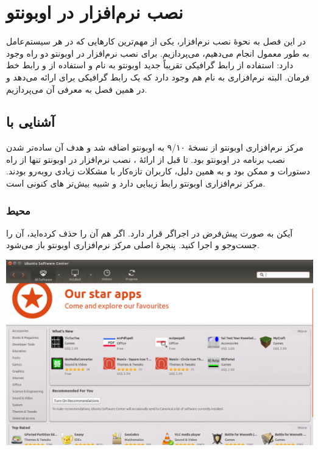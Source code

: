 \chapter{نصب نرم‌افزار در اوبونتو}
در این فصل به نحوهٔ نصب نرم‌افزار، یکی از مهم‌ترین کارهایی که در هر سیستم‌عامل به طور معمول انجام می‌دهیم، می‌پردازیم. برای نصب نرم‌افزار در اوبونتو دو راه وجود دارد: استفاده از رابط گرافیکی تقریباً جدید اوبونتو به نام  و استفاده از  و رابط خط فرمان. البته نرم‌افزاری به نام  هم وجود دارد که یک رابط گرافیکی برای  ارائه می‌دهد و در همین فصل به معرفی آن می‌پردازیم.

\section[آشنایی با Center Software Ubuntu]{آشنایی با }
مرکز نرم‌افزاری اوبونتو از نسخهٔ ۹/۱۰ به اوبونتو اضافه شد و هدف آن ساده‌تر شدن نصب برنامه در اوبونتو بود. تا قبل از ارائهٔ ، نصب نرم‌افزار در اوبونتو تنها از راه دستورات  و  ممکن بود و به همین دلیل، کاربران تازه‌کار با مشکلات زیادی روبه‌رو بودند. مرکز نرم‌افزاری اوبونتو رابط زیبایی دارد و شبیه بیش‌تر های کنونی است.

\subsection[محیط Center Software Ubuntu]{محیط }
آیکن  به صورت پیش‌فرض در اجراگر قرار دارد. اگر هم آن را حذف کرده‌اید، آن را جست‌وجو و اجرا کنید. پنجرهٔ اصلی مرکز نرم‌افزاری اوبونتو باز می‌شود.

\begin{center}
\includegraphics[scale=0.4]{pics/35.png}
\end{center}

